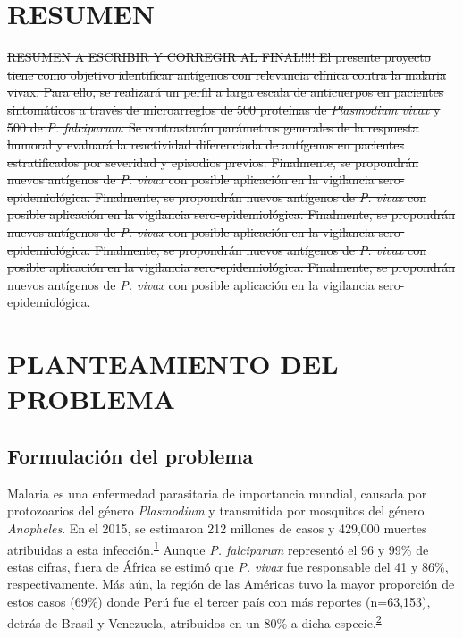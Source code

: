 \documentclass[]{article}
\begin{document}
\vfill
\restoregeometry
\clearpage

\newpage

\tableofcontents

\newpage


\section*{RESUMEN}\label{resumen}

\sout{RESUMEN A ESCRIBIR Y CORREGIR AL FINAL!!!! El presente proyecto
tiene como objetivo identificar antígenos con relevancia clínica contra
la malaria vivax. Para ello, se realizará un perfil a larga escala de
anticuerpos en pacientes sintomáticos a través de microarreglos de 500
proteínas de \emph{Plasmodium vivax} y 500 de \emph{P. falciparum}. Se
contrastarán parámetros generales de la respuesta humoral y evaluará la
reactividad diferenciada de antígenos en pacientes estratificados por
severidad y episodios previos. Finalmente, se propondrán nuevos
antígenos de \emph{P. vivax} con posible aplicación en la vigilancia
sero-epidemiológica. Finalmente, se propondrán nuevos antígenos de
\emph{P. vivax} con posible aplicación en la vigilancia
sero-epidemiológica. Finalmente, se propondrán nuevos antígenos de
\emph{P. vivax} con posible aplicación en la vigilancia
sero-epidemiológica. Finalmente, se propondrán nuevos antígenos de
\emph{P. vivax} con posible aplicación en la vigilancia
sero-epidemiológica. Finalmente, se propondrán nuevos antígenos de
\emph{P. vivax} con posible aplicación en la vigilancia
sero-epidemiológica.}

\section{PLANTEAMIENTO DEL PROBLEMA}\label{planteamiento-del-problema}

\subsection{Formulación del problema}\label{intro}

Malaria es una enfermedad parasitaria de importancia mundial, causada
por protozoarios del género \emph{Plasmodium} y transmitida por
mosquitos del género \emph{Anopheles}. En el 2015, se estimaron 212
millones de casos y 429,000 muertes atribuidas a esta
infección.\textsuperscript{\protect\hyperlink{ref-WHO2016world}{1}}
Aunque \emph{P. falciparum} representó el 96 y 99\% de estas cifras,
fuera de África se estimó que \emph{P. vivax} fue responsable del 41 y
86\%, respectivamente. Más aún, la región de las Américas tuvo la mayor
proporción de estos casos (69\%) donde Perú fue el tercer país con más
reportes (n=63,153), detrás de Brasil y Venezuela, atribuidos en un 80\%
a dicha
especie.\textsuperscript{\protect\hyperlink{ref-rosas2016peru}{2}}
\end{document}
